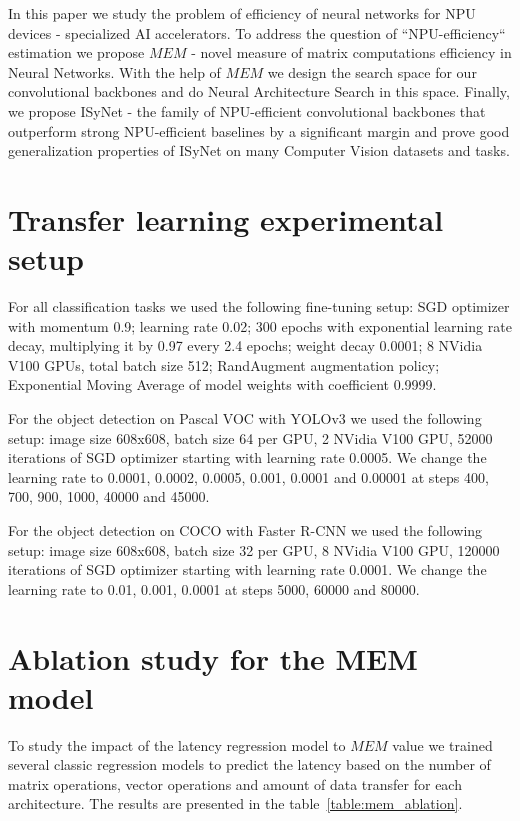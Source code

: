 \documentclass[letterpaper]{article}
\begin{document}
In this paper we study the problem of efficiency of neural networks for NPU devices - specialized AI accelerators.
To address the question of ``NPU-efficiency`` estimation we propose $MEM$ - novel measure of matrix computations efficiency in Neural Networks.
With the help of $MEM$ we design the search space for our convolutional backbones and do Neural Architecture Search in this space.
Finally, we propose ISyNet - the family of NPU-efficient convolutional backbones that outperform strong NPU-efficient baselines by a significant margin and prove good generalization properties of ISyNet on many Computer Vision datasets and tasks.

\clearpage



\clearpage

\appendix

\section{Transfer learning experimental setup}

For all classification tasks we used the following fine-tuning setup: SGD optimizer with momentum 0.9; learning rate 0.02; 300 epochs with exponential learning rate decay, multiplying it by 0.97 every 2.4 epochs; weight decay 0.0001; 8 NVidia V100 GPUs, total batch size 512; RandAugment augmentation policy; Exponential Moving Average of model weights with coefficient 0.9999.

For the object detection on Pascal VOC with YOLOv3 we used the following setup: image size 608x608, batch size 64 per GPU, 2 NVidia V100 GPU, 52000 iterations of SGD optimizer starting with learning rate 0.0005. We change the learning rate to 0.0001, 0.0002, 0.0005, 0.001, 0.0001 and 0.00001 at steps 400, 700, 900, 1000, 40000 and 45000.

For the object detection on COCO with Faster R-CNN we used the following setup: image size 608x608, batch size 32 per GPU, 8 NVidia V100 GPU, 120000 iterations of SGD optimizer starting with learning rate 0.0001. We change the learning rate to 0.01, 0.001, 0.0001 at steps 5000, 60000 and 80000.

\section{Ablation study for the MEM model}

To study the impact of the latency regression model to $MEM$ value we trained several classic regression models to predict the latency based on the number of matrix operations, vector operations and amount of data transfer for each architecture. The results are presented in the table~\ref{table:mem_ablation}. 
\end{document}
